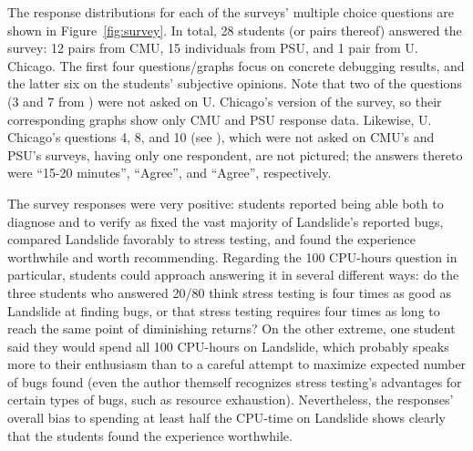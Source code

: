 
The response distributions for each of the surveys' multiple choice questions
are shown in Figure~\ref{fig:survey}.
In total, 28 students (or pairs thereof) answered the survey:
12 pairs from CMU, 15 individuals from PSU, and 1 pair from U. Chicago.
The first four questions/graphs focus on concrete debugging results,
and the latter six on the students' subjective opinions.
%
Note that two of the questions
(3 and 7 from \sect{\ref{sec:education-survey-pebbles}})
were not asked on U. Chicago's version of the survey,
so their corresponding graphs show only CMU and PSU response data.
Likewise, U. Chicago's questions 4, 8, and 10
(see \sect{\ref{sec:education-survey-pintos}}),
which were not asked on CMU's and PSU's surveys,
having only one respondent,
are not pictured;
the answers thereto were ``15-20 minutes'', ``Agree'', and ``Agree'', respectively.

The survey responses were very positive:
students reported being able both to diagnose and to verify as fixed the vast majority of Landslide's reported bugs,
compared Landslide favorably to stress testing,
and found the experience worthwhile and worth recommending.
Regarding the 100 CPU-hours question in particular,
students could approach answering it in several different ways:
do the three students who answered 20/80 think stress testing is four times as good as Landslide at finding bugs,
or that stress testing requires four times as long to reach the same point of diminishing returns?
On the other extreme, one student said they would spend all 100 CPU-hours on Landslide,
which probably speaks more to their enthusiasm than to a careful attempt to maximize expected number of bugs found
(even the author themself recognizes stress testing's advantages for certain types of bugs, such as resource exhaustion).
Nevertheless, the responses' overall bias to spending at least half the CPU-time on Landslide
shows clearly that the students found the experience worthwhile.

